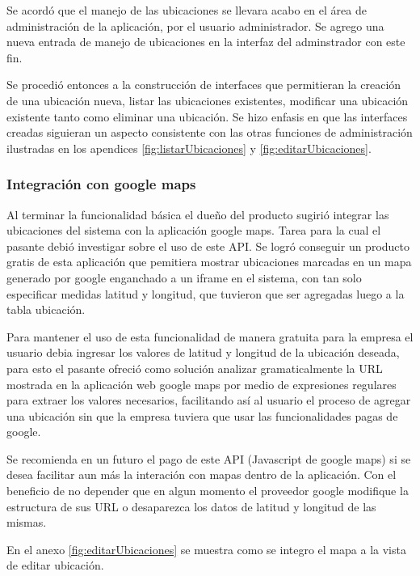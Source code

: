 Se acordó que el manejo de las ubicaciones se llevara acabo en el área de administración de la aplicación, por el usuario administrador. Se agrego una nueva entrada de manejo de ubicaciones en la interfaz del adminstrador con este fin.

Se procedió entonces a la construcción de interfaces que permitieran la creación de una ubicación nueva, listar las ubicaciones existentes, modificar una ubicación existente tanto como eliminar una ubicación. Se hizo enfasis en que las interfaces creadas siguieran un aspecto consistente con las otras funciones de administración ilustradas en los apendices \ref{fig:listarUbicaciones} y \ref{fig:editarUbicaciones}.

\subsubsection{Integración con google maps}

Al terminar la funcionalidad básica el dueño del producto sugirió integrar las ubicaciones del sistema con la aplicación google maps. Tarea para la cual el pasante debió investigar sobre el uso de este API. Se logró conseguir un producto gratis de esta aplicación que pemitiera mostrar ubicaciones marcadas en un mapa generado por google enganchado a un iframe en el sistema, con tan solo especificar medidas latitud y longitud, que tuvieron que ser agregadas luego a la tabla ubicación.

Para mantener el uso de esta funcionalidad de manera gratuita para la empresa el usuario debia ingresar los valores de latitud y longitud de la ubicación deseada, para esto el pasante ofreció como solución analizar gramaticalmente la URL mostrada en la aplicación web google maps por medio de expresiones regulares para extraer los valores necesarios, facilitando así al usuario el proceso de agregar una ubicación sin que la empresa tuviera que usar las funcionalidades pagas de google.

Se recomienda en un futuro el pago de este API (Javascript de google maps) si se desea facilitar aun más la interación con mapas dentro de la aplicación. Con el beneficio de no depender que en algun momento el proveedor google modifique la estructura de sus URL o desaparezca los datos de latitud y longitud de las mismas.

En el anexo \ref{fig:editarUbicaciones} se muestra como se integro el mapa a la vista de editar ubicación.






